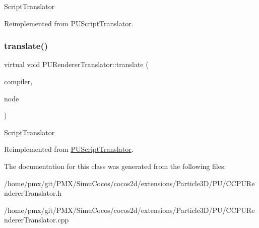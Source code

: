 Script\+Translator 

Reimplemented from \hyperlink{classPUScriptTranslator_a9ff2cdfda9ea8db6fd716e7b69dbe79b}{P\+U\+Script\+Translator}.

\mbox{\label{classPURendererTranslator_a05760de688c368e267b7f122a901b273}} 
\subsubsection{\texorpdfstring{translate()}{translate()}\hspace{0.1cm}{\footnotesize\ttfamily [2/2]}}
{\footnotesize\ttfamily virtual void P\+U\+Renderer\+Translator\+::translate (\begin{DoxyParamCaption}\item[{\hyperlink{classPUScriptCompiler}{P\+U\+Script\+Compiler} $\ast$}]{compiler,  }\item[{\hyperlink{classPUAbstractNode}{P\+U\+Abstract\+Node} $\ast$}]{node }\end{DoxyParamCaption})\hspace{0.3cm}{\ttfamily [virtual]}}

Script\+Translator 

Reimplemented from \hyperlink{classPUScriptTranslator_a9ff2cdfda9ea8db6fd716e7b69dbe79b}{P\+U\+Script\+Translator}.



The documentation for this class was generated from the following files\+:\begin{DoxyCompactItemize}
\item 
/home/pmx/git/\+P\+M\+X/\+Simu\+Cocos/cocos2d/extensions/\+Particle3\+D/\+P\+U/C\+C\+P\+U\+Renderer\+Translator.\+h\item 
/home/pmx/git/\+P\+M\+X/\+Simu\+Cocos/cocos2d/extensions/\+Particle3\+D/\+P\+U/C\+C\+P\+U\+Renderer\+Translator.\+cpp\end{DoxyCompactItemize}

